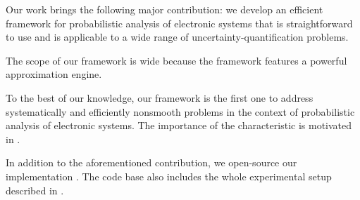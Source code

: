 Our work brings the following major contribution: we develop an efficient
framework for probabilistic analysis of electronic systems that is
straightforward to use and is applicable to a wide range of
uncertainty-quantification problems.


The scope of our framework is wide because the framework features a powerful
approximation engine. 

To the best of our knowledge, our framework is the first one to address
systematically and efficiently nonsmooth problems in the context of
probabilistic analysis of electronic systems. The importance of the
characteristic is motivated in .

In addition to the aforementioned contribution, we open-source our
implementation \cite{sources}. The code base also includes the whole
experimental setup described in .
